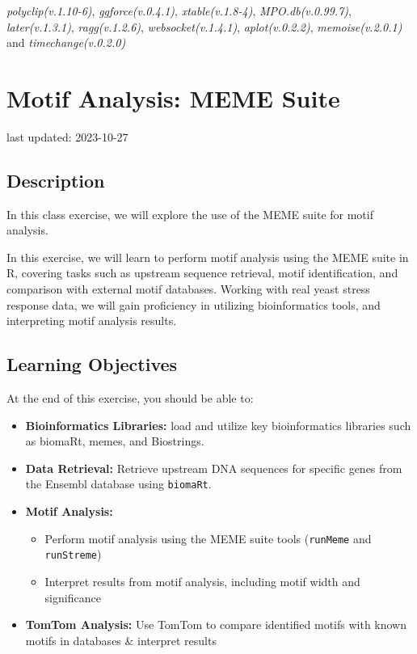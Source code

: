 \documentclass[
]{book}
\providecommand{\tightlist}{%
  \setlength{\itemsep}{0pt}\setlength{\parskip}{0pt}}
\begin{document}
\emph{polyclip(v.1.10-6)}, \emph{ggforce(v.0.4.1)}, \emph{xtable(v.1.8-4)}, \emph{MPO.db(v.0.99.7)}, \emph{later(v.1.3.1)}, \emph{ragg(v.1.2.6)}, \emph{websocket(v.1.4.1)}, \emph{aplot(v.0.2.2)}, \emph{memoise(v.2.0.1)} and \emph{timechange(v.0.2.0)}

\hypertarget{motif-analysis-meme-suite}{%
\chapter{Motif Analysis: MEME Suite}\label{motif-analysis-meme-suite}}

last updated: 2023-10-27

\hypertarget{description-8}{%
\section{Description}\label{description-8}}

In this class exercise, we will explore the use of the MEME suite for
motif analysis.

In this exercise, we will learn to perform motif analysis using the MEME
suite in R, covering tasks such as upstream sequence retrieval, motif
identification, and comparison with external motif databases. Working
with real yeast stress response data, we will gain proficiency in
utilizing bioinformatics tools, and interpreting motif analysis results.

\hypertarget{learning-objectives-1}{%
\section{Learning Objectives}\label{learning-objectives-1}}

At the end of this exercise, you should be able to:

\begin{itemize}
\tightlist
\item
  \textbf{Bioinformatics Libraries:} load and utilize key bioinformatics
  libraries such as biomaRt, memes, and Biostrings.
\item
  \textbf{Data Retrieval:} Retrieve upstream DNA sequences for specific
  genes from the Ensembl database using \texttt{biomaRt}.
\item
  \textbf{Motif Analysis:}

  \begin{itemize}
  \tightlist
  \item
    Perform motif analysis using the MEME suite tools (\texttt{runMeme} and
    \texttt{runStreme})
  \item
    Interpret results from motif analysis, including motif width and
    significance
  \end{itemize}
\item
  \textbf{TomTom Analysis:} Use TomTom to compare identified motifs with
  known motifs in databases \& interpret results
\end{itemize}
\end{document}

